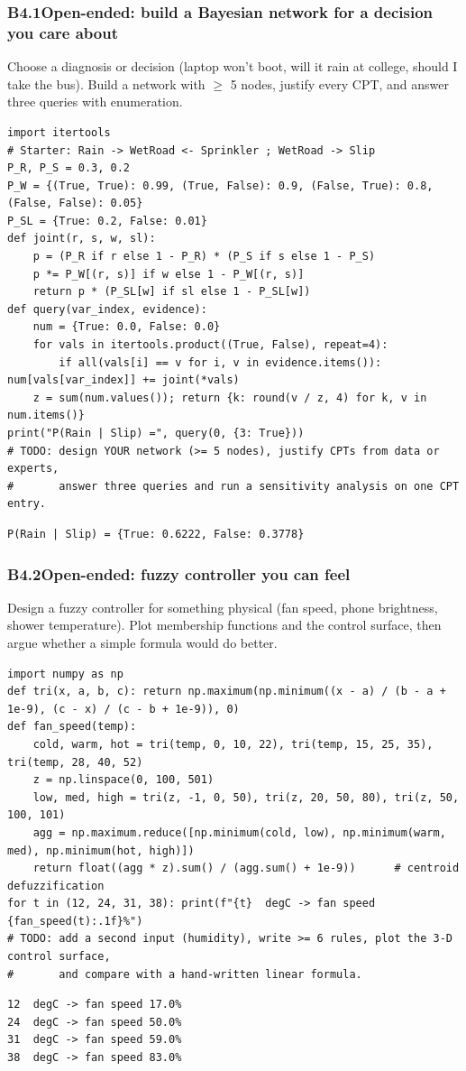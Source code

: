 \documentclass[11pt]{article}
\begin{document}
\subsubsection*{B4.1\quad Open-ended: build a Bayesian network for a decision you care about}
Choose a diagnosis or decision (laptop won't boot, will it rain at college, should I take the bus). Build a network with $\ge$ 5 nodes, justify every CPT, and answer three queries with enumeration.
\begin{lstlisting}[style=py]
import itertools
# Starter: Rain -> WetRoad <- Sprinkler ; WetRoad -> Slip
P_R, P_S = 0.3, 0.2
P_W = {(True, True): 0.99, (True, False): 0.9, (False, True): 0.8, (False, False): 0.05}
P_SL = {True: 0.2, False: 0.01}
def joint(r, s, w, sl):
    p = (P_R if r else 1 - P_R) * (P_S if s else 1 - P_S)
    p *= P_W[(r, s)] if w else 1 - P_W[(r, s)]
    return p * (P_SL[w] if sl else 1 - P_SL[w])
def query(var_index, evidence):
    num = {True: 0.0, False: 0.0}
    for vals in itertools.product((True, False), repeat=4):
        if all(vals[i] == v for i, v in evidence.items()): num[vals[var_index]] += joint(*vals)
    z = sum(num.values()); return {k: round(v / z, 4) for k, v in num.items()}
print("P(Rain | Slip) =", query(0, {3: True}))
# TODO: design YOUR network (>= 5 nodes), justify CPTs from data or experts,
#       answer three queries and run a sensitivity analysis on one CPT entry.
\end{lstlisting}
\begin{lstlisting}[style=out]
P(Rain | Slip) = {True: 0.6222, False: 0.3778}
\end{lstlisting}
\subsubsection*{B4.2\quad Open-ended: fuzzy controller you can feel}
Design a fuzzy controller for something physical (fan speed, phone brightness, shower temperature). Plot membership functions and the control surface, then argue whether a simple formula would do better.
\begin{lstlisting}[style=py]
import numpy as np
def tri(x, a, b, c): return np.maximum(np.minimum((x - a) / (b - a + 1e-9), (c - x) / (c - b + 1e-9)), 0)
def fan_speed(temp):
    cold, warm, hot = tri(temp, 0, 10, 22), tri(temp, 15, 25, 35), tri(temp, 28, 40, 52)
    z = np.linspace(0, 100, 501)
    low, med, high = tri(z, -1, 0, 50), tri(z, 20, 50, 80), tri(z, 50, 100, 101)
    agg = np.maximum.reduce([np.minimum(cold, low), np.minimum(warm, med), np.minimum(hot, high)])
    return float((agg * z).sum() / (agg.sum() + 1e-9))      # centroid defuzzification
for t in (12, 24, 31, 38): print(f"{t}  degC -> fan speed {fan_speed(t):.1f}%")
# TODO: add a second input (humidity), write >= 6 rules, plot the 3-D control surface,
#       and compare with a hand-written linear formula.
\end{lstlisting}
\begin{lstlisting}[style=out]
12  degC -> fan speed 17.0%
24  degC -> fan speed 50.0%
31  degC -> fan speed 59.0%
38  degC -> fan speed 83.0%
\end{lstlisting}
\end{document}
